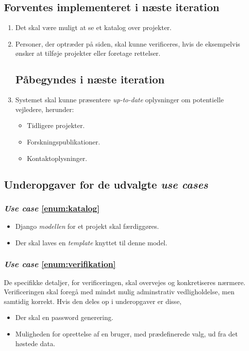 \documentclass[11pt]{article}
\begin{document}
\subsection*{Forventes implementeret i næste iteration}
\begin{enumerate}
	\item \label{enum:katalog} Det skal være muligt at se et katalog over projekter.

	\item \label{enum:verifikation} Personer, der optræder på siden, skal kunne verificeres, hvis de eksempelvis ønsker at tilføje projekter eller foretage rettelser.

\subsection*{Påbegyndes i næste iteration}

	\item \label{enum:vejlederInfo} Systemet skal kunne præsentere \textit{up-to-date} oplysninger om potentielle vejledere, herunder:
	\begin{itemize}
		\item Tidligere projekter.
		\item Forskningspublikationer.
		\item Kontaktoplysninger.
	\end{itemize}
\end{enumerate}

\subsection{Underopgaver for de udvalgte \textit{use cases}}
\subsubsection*{\textit{Use case} \ref{enum:katalog}}
\begin{itemize}
	\item Django \textit{modellen} for et projekt skal færdiggøres.
	\item Der skal laves en \textit{template} knyttet til denne model.
\end{itemize}

\subsubsection*{\textit{Use case} \ref{enum:verifikation}}
De specifikke detaljer, for verificeringen, skal overvejes og konkretiseres nærmere. Verificeringen skal foregå med mindst mulig adminstrativ vedligholdelse, men samtidig korrekt. Hvis den deles op i underopgaver er disse,
\begin{itemize}
	\item Der skal en password generering.
	\item Muligheden for oprettelse af en bruger, med prædefinerede valg, ud fra det høstede data.
\end{itemize}
\end{document}
